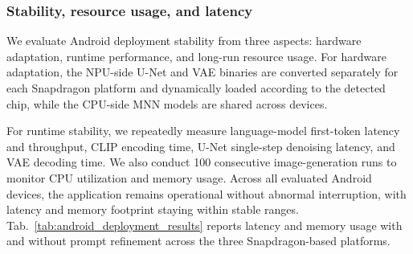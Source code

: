 \subsubsection{Stability, resource usage, and latency}

We evaluate Android deployment stability from three aspects: hardware adaptation, runtime performance, and long-run resource usage. For hardware adaptation, the NPU-side U-Net and VAE binaries are converted separately for each Snapdragon platform and dynamically loaded according to the detected chip, while the CPU-side MNN models are shared across devices.

For runtime stability, we repeatedly measure language-model first-token latency and throughput, CLIP encoding time, U-Net single-step denoising latency, and VAE decoding time. We also conduct 100 consecutive image-generation runs to monitor CPU utilization and memory usage. Across all evaluated Android devices, the application remains operational without abnormal interruption, with latency and memory footprint staying within stable ranges. Tab.~\ref{tab:android_deployment_results} reports latency and memory usage with and without prompt refinement across the three Snapdragon-based platforms.


